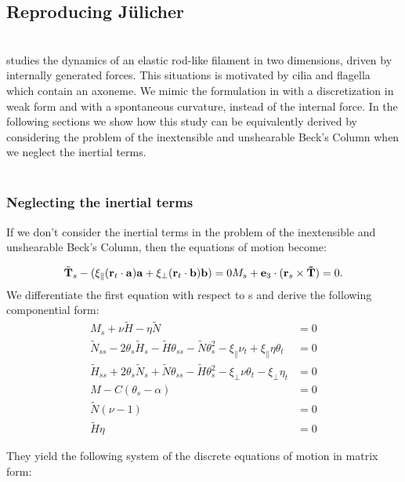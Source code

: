 
\subsection{Reproducing Jülicher}
\\
\cite{julicher} studies the dynamics of an elastic rod-like filament in two dimensions, driven by internally generated forces. This situations is motivated by cilia and flagella which contain an axoneme. We mimic the formulation in \cite{julicher} with a discretization in weak form and with a spontaneous curvature, instead of the internal force. In the following sections we show how this study can be equivalently derived by considering the problem of the inextensible and unshearable Beck’s Column when we neglect the inertial terms.
\\\\
\subsubsection{Neglecting the inertial terms}
If we don't consider the inertial terms in the problem of the inextensible and unshearable Beck’s Column, then the equations of motion become:

\[ \tilde{\mathbf{T}}_s - (\xi_\parallel (\mathbf{r}_t\cdot\mathbf{a})\mathbf{a} + \xi_\perp (\mathbf{r}_t\cdot\mathbf{b})\mathbf{b}) = 0\\

M_s + \mathbf{e}_3 \cdot(\mathbf{r}_s \times \mathbf{\tilde{T}}) = 0.
\]
We differentiate the first equation with respect to s and derive the following componential form:
\begin{align}
M_s + \nu \tilde{H} -\eta \tilde{N} 
&= 0\\
\tilde{N}_{ss} - 2\theta_s\tilde{H}_s - \tilde{H}\theta_{ss}- \tilde{N}\theta_s^2
- \xi_{\parallel}\nu_t + \xi_{\parallel}\eta\theta_t &= 0\\
\tilde{H}_{ss} + 2\theta_s\tilde{N}_s + \tilde{N}\theta_{ss} - \tilde{H}\theta_s^2  - \xi_{\perp}\nu\theta_t - \xi_{\perp}\eta_t
&= 0\\
M - C(\theta_s -\alpha)  &= 0\\
\tilde{N}(\nu - 1) &= 0\\
\tilde{H}\eta &= 0
\end{align}

They yield the following system of the discrete equations of motion in matrix form:

